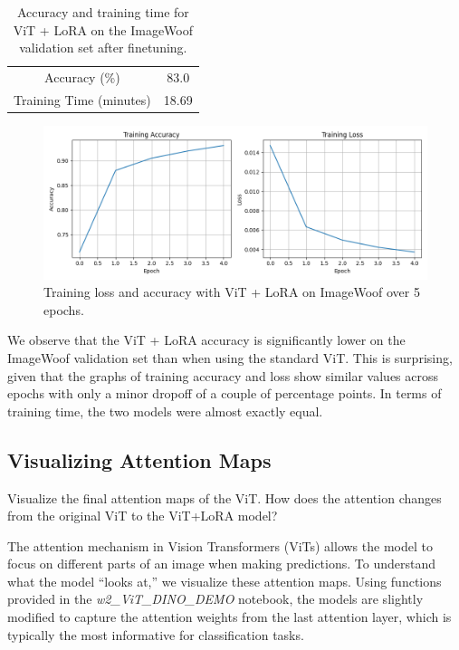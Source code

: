\documentclass[10pt]{article}
\begin{document}
\begin{table}[ht]
    \centering
    \begin{tabular}{c|c}
        Accuracy (\%) &  83.0 \\
        Training Time (minutes) & 18.69
    \end{tabular}
    \caption{Accuracy and training time for ViT + LoRA on the ImageWoof validation set after finetuning.}
    \label{tab:placeholder}
\end{table}

\begin{figure}[ht]
    \centering
    \includegraphics[width=1\linewidth]{images/training_loss_curve_LoRA.png}
    \caption{Training loss and accuracy with ViT + LoRA on ImageWoof over 5 epochs.}
    \label{fig:placeholder}
\end{figure}

We observe that the ViT + LoRA accuracy is significantly lower on the ImageWoof validation set than when using the standard ViT. This is surprising, given that the graphs of training accuracy and loss show similar values across epochs with only a minor dropoff of a couple of percentage points. In terms of training time, the two models were almost exactly equal.

\subsection{Visualizing Attention Maps}
Visualize the final attention maps of the ViT. How does the attention changes from the original ViT to the ViT+LoRA model?

The attention mechanism in Vision Transformers (ViTs) allows the model to focus on different parts of an image when making predictions. To understand what the model ``looks at,'' we visualize these attention maps. Using functions provided in the \textit{w2\_ViT\_DINO\_DEMO} notebook, the models are slightly modified to capture the attention weights from the last attention layer, which is typically the most informative for classification tasks.
\end{document}
